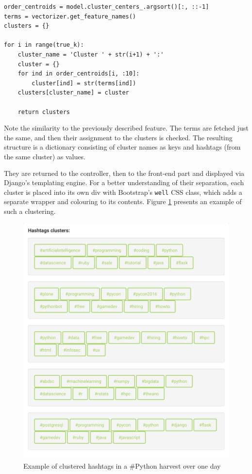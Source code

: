 \documentclass[12pt,a4paper,twoside]{report}
\begin{document}
\lstset{basicstyle=\small, breaklines=True}
\begin{lstlisting}
order_centroids = model.cluster_centers_.argsort()[:, ::-1]
terms = vectorizer.get_feature_names()
clusters = {}

for i in range(true_k):
    cluster_name = 'Cluster ' + str(i+1) + ':'
    cluster = {}
    for ind in order_centroids[i, :10]:
        cluster[ind] = str(terms[ind])
    clusters[cluster_name] = cluster

    return clusters
\end{lstlisting}

Note the similarity to the previously described feature. The terms are fetched just the same, and then their assignment to the clusters is checked. The resulting structure is a dictionary consisting of cluster names as keys and hashtags (from the same cluster) as values.

They are returned to the controller, then to the front-end part and displayed via Django's templating engine. For a better understanding of their separation, each cluster is placed into its own div with Bootstrap's \texttt{well} CSS class, which adds a separate wrapper and colouring to its contents. Figure \ref{fig:clusters} presents an example of such a clustering.

\begin{figure}[ht]
    \centering
\includegraphics[width=0.7\columnwidth]{img/clusters.png}
    \caption{Example of clustered hashtags in a \#Python harvest over one day}
    \label{fig:clusters}
\end{figure}
\end{document}
